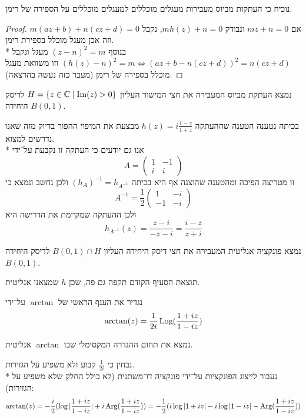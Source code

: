 \Subquestion{}
נוכיח כי העתקות מביוס מעבירות מעגלים מוכללים למעגלים מוכללים על הספירה של רימן.
\begin{proof}
	אם $m z + n = 0$ ונבודק $m h(z) + n = 0$, נקבל $m(az + b) + n(cz + d) = 0$ וזה אכן מעגל מוכלל בספירת רימן. \\*
	בנוסף ${(z - n)}^2 = m$ מעגל ונקבל ${(h(z) - n)}^2 = m \iff {(az + b - n(cz + d))}^2 = n(cz + d)$ וזו משוואת מעגל מוכלל בספירה של רימן (מעבר כזה נעשה בהרצאה).
\end{proof}

\Subquestion{}
נמצא העתקת מביוס המעבירה את חצי המישור העליון $H = \{ z \in \mathbb{C} \mid \operatorname{Im}(z) > 0 \}$ לדיסק היחידה $B(0, 1)$.
\begin{solution}
	בכיתה נטענה הטענה שההעתקה $h(z) = i \frac{1 - z}{1 + z}$ מבצעת את המיפוי ההפוך בדיוק מזה שאנו נדרשים למצוא. \\*
	אנו גם יודעים כי העתקה זו נקבעת על־ידי
	\[
		A = \begin{pmatrix}
			1 & -1 \\
			i & i
		\end{pmatrix}
	\]
	זו מטריצה הפיכה ומהטענה שהוצגה אף היא בכיתה ${(h_A)}^{-1} = h_{A^{-1}}$ ולכן נחשב ונמצא כי
	\[
		A^{-1} = \frac{1}{2} \begin{pmatrix}
			1 & -i \\
			-1 & -i
		\end{pmatrix}
	\]
	ולכן ההעתקה שמקיימת את הדרישה היא
	\[
		h_{A^{-1}}(z)
		= \frac{z - i}{-z - i}
		= \frac{i - z}{z + i}
	\]
\end{solution}

\Subquestion{}
נמצא פונקציה אנליטית המעבירה את חצי דיסק היחידה העליון $B(0, 1) \cap H$ לדיסק היחידה $B(0, 1)$.
\begin{solution}
	תוצאת הסעיף הקודם תקפה גם פה, שכן $h$ שמצאנו אנליטית.
\end{solution}

\Question{}
נגדיר את הענף הראשי של $\arctan$ על־ידי
\[
	\arctan(z) = \frac{1}{2i} \operatorname{Log}(\frac{1 + iz}{1 - iz})
\]

\Subquestion{}
נמצא את תחום ההגדרה המקסימלי שבו $\arctan$ אנליטית.
\begin{solution}
	נבחין כי $\frac{1}{2i}$ קבוע ולא משפיע על הגזירות. \\*
	נעבור לייצוג הפונקציות על־ידי פונקציה דו־משתנית (לא כולל החלק שלא משפיע על הגזירות):
	\[
		\arctan(z)
		= -\frac{i}{2} (\log|\frac{1 + iz}{1 - iz}| + i \operatorname{Arg}(\frac{1 + iz}{1 - iz}))
		= -\frac{1}{2} (i \log|1 + iz| - i \log|1 - iz| - \operatorname{Arg}(\frac{1 + iz}{1 - iz}))
	\]
\end{solution}

